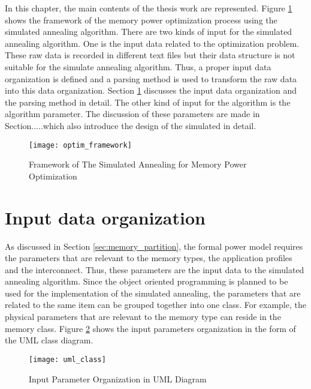 \label{chap:main_work}
In this chapter, the main contents of the thesis work are represented.
Figure \ref{fig:framework} shows the framework of the memory power
optimization process using the simulated annealing algorithm.
There are two kinds of input for the simulated annealing algorithm.
One is the input data related to the optimization problem.
These raw data is recorded in different text files but their data
structure is not suitable for the simulate annealing algorithm.
Thus, a proper input data organization is defined and a parsing
method is used to transform the raw data into this data organization.
Section \ref{sec:input_organ} discusses the input data organization
and the parsing method in detail.
The other kind of input for the algorithm is the algorithm parameter.
The discussion of these parameters are made in Section.....which also
introduce the design of the simulated in detail.
\begin{figure}[H]
	\begin{center}
		\texttt{[image: optim\_framework]}
		\caption{Framework of The Simulated Annealing for Memory Power Optimization}
		\label{fig:framework}
	\end{center}
\end{figure}
	\section{Input data organization}
	\label{sec:input_organ}
	As discussed in Section \ref{sec:memory_partition}, the formal
	power model requires the parameters that are relevant to the
	memory types, the application profiles and the interconnect.
	Thus, these parameters are the input data to the simulated
	annealing algorithm.
	Since the object oriented programming is planned to be used for
	the implementation of the simulated annealing, the parameters
	that are related to the same item can be grouped together into
	one class. For example, the physical parameters that are
	relevant to the memory type can reside in the memory class.
	Figure \ref{fig:uml} shows the input parameters
	organization in the form of the UML class diagram.

	\begin{figure}[htb]
		\begin{center}
			\texttt{[image: uml\_class]}
			\caption{Input Parameter Organization in UML Diagram}
			\label{fig:uml}
		\end{center}
	\end{figure}
	
